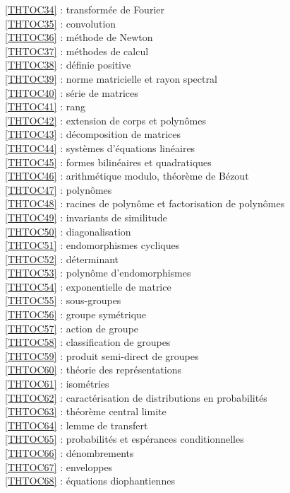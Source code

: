 \ref {THTOC34} : transformée de Fourier\\
\ref {THTOC35} : convolution\\
\ref {THTOC36} : méthode de Newton\\
\ref {THTOC37} : méthodes de calcul\\
\ref {THTOC38} : définie positive\\
\ref {THTOC39} : norme matricielle et rayon spectral\\
\ref {THTOC40} : série de matrices\\
\ref {THTOC41} : rang\\
\ref {THTOC42} : extension de corps et polynômes\\
\ref {THTOC43} : décomposition de matrices\\
\ref {THTOC44} : systèmes d'équations linéaires\\
\ref {THTOC45} : formes bilinéaires et quadratiques\\
\ref {THTOC46} : arithmétique modulo, théorème de Bézout\\
\ref {THTOC47} : polynômes\\
\ref {THTOC48} : racines de polynôme et factorisation de polynômes\\
\ref {THTOC49} : invariants de similitude\\
\ref {THTOC50} : diagonalisation\\
\ref {THTOC51} : endomorphismes cycliques\\
\ref {THTOC52} : déterminant\\
\ref {THTOC53} : polynôme d'endomorphismes\\
\ref {THTOC54} : exponentielle de matrice\\
\ref {THTOC55} : sous-groupes\\
\ref {THTOC56} : groupe symétrique\\
\ref {THTOC57} : action de groupe\\
\ref {THTOC58} : classification de groupes\\
\ref {THTOC59} : produit semi-direct de groupes\\
\ref {THTOC60} : théorie des représentations\\
\ref {THTOC61} : isométries\\
\ref {THTOC62} : caractérisation de distributions en probabilités\\
\ref {THTOC63} : théorème central limite\\
\ref {THTOC64} : lemme de transfert\\
\ref {THTOC65} : probabilités et espérances conditionnelles\\
\ref {THTOC66} : dénombrements\\
\ref {THTOC67} : enveloppes\\
\ref {THTOC68} : équations diophantiennes\\
